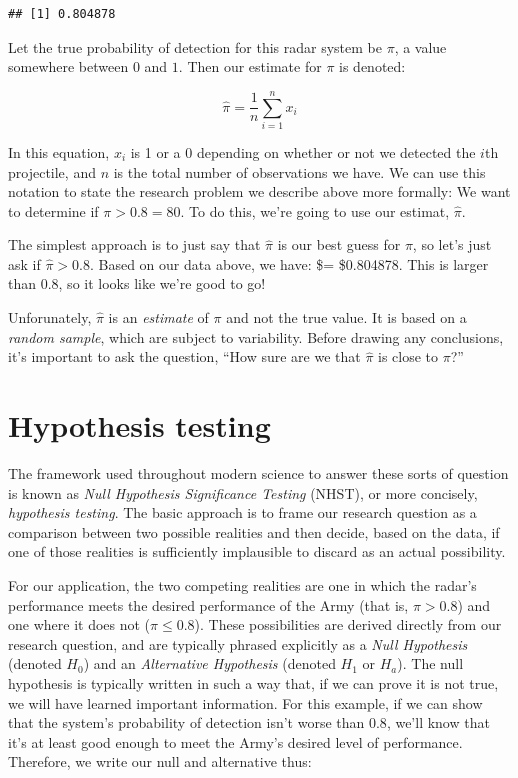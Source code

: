 \documentclass[
]{book}
\theoremstyle{definition}
\theoremstyle{definition}
\theoremstyle{definition}
\theoremstyle{remark}
\begin{document}
\begin{verbatim}
## [1] 0.804878
\end{verbatim}

Let the true probability of detection for this radar system be \(\pi\), a value somewhere between \(0\) and \(1\). Then our estimate for \(\pi\) is denoted:

\[\hat\pi = \frac{1}{n}\sum_{i = 1}^n x_i\]

In this equation, \(x_i\) is 1 or a 0 depending on whether or not we detected the \(i\)th projectile, and \(n\) is the total number of observations we have. We can use this notation to state the research problem we describe above more formally: We want to determine if \(\pi > 0.8 = 80%
\). To do this, we're going to use our estimat, \(\hat \pi\).

The simplest approach is to just say that \(\hat \pi\) is our best guess for \(\pi\), so let's just ask if \(\hat \pi> 0.8\). Based on our data above, we have: \$\hat\pi = \$0.804878. This is larger than 0.8, so it looks like we're good to go!

Unforunately, \(\hat \pi\) is an \emph{estimate} of \(\pi\) and not the true value. It is based on a \emph{random sample}, which are subject to variability. Before drawing any conclusions, it's important to ask the question, ``How sure are we that \(\hat\pi\) is close to \(\pi\)?''

\hypertarget{hypothesis-testing}{%
\section{Hypothesis testing}\label{hypothesis-testing}}

The framework used throughout modern science to answer these sorts of question is known as \emph{Null Hypothesis Significance Testing} (NHST), or more concisely, \emph{hypothesis testing}. The basic approach is to frame our research question as a comparison between two possible realities and then decide, based on the data, if one of those realities is sufficiently implausible to discard as an actual possibility.

For our application, the two competing realities are one in which the radar's performance meets the desired performance of the Army (that is, \(\pi > 0.8\)) and one where it does not (\(\pi \le 0.8\)). These possibilities are derived directly from our research question, and are typically phrased explicitly as a \emph{Null Hypothesis} (denoted \(H_0\)) and an \emph{Alternative Hypothesis} (denoted \(H_1\) or \(H_a\)). The null hypothesis is typically written in such a way that, if we can prove it is not true, we will have learned important information. For this example, if we can show that the system's probability of detection isn't worse than \(0.8\), we'll know that it's at least good enough to meet the Army's desired level of performance. Therefore, we write our null and alternative thus:
\end{document}
